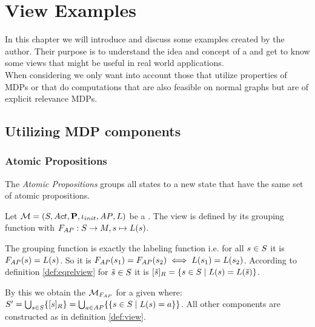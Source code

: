 \documentclass[preview]{standalone}
\begin{document}
\section{View Examples}
In this chapter we will introduce and discuss some \viewN examples created by the author. Their purpose is to understand the idea and concept of a \viewN and get to know some views that might be useful in real world applications. \\
When considering \viewsN we only want into account those that utilize properties of MDPs or that do computations that are also feasible on normal graphs but are of explicit relevance MDPs.
\subsection{Utilizing MDP components}
\subsubsection{Atomic Propositions}
The \emph{Atomic Propositions \viewNC} groups all states to a new state that have the same set of atomic propositions.

\begin{definition}	
	Let ${{{\mathcal{M}}}} = {{({S}, {Act}, {\textbf{P}}, {\iota_{init}}, {AP}, {L})}}$ be a \chosengraphtypeN. The view \viewatomicprops is defined by its grouping function \gfctatomicprops \grpfctN with $\gfctatomicprops : \states \to \imggrp, {\state}\mapsto{\labelingfct(\state)}$.
\end{definition}

The grouping function is exactly the labeling function i.e. for all ${s} \in {S}$ it is ${{{{F}}_{AP}}}({s}) = {L}({s})$. So it is ${{{{F}}_{AP}}}({s}_1) = {{{{F}}_{AP}}}({s}_2) \iff {L}({s}_1) = {L}({s}_2)$. According to definition \ref{def:eqrelview} for ${\tilde{{s}}} \in {S}$ it is ${{[{\tilde{{s}}}]_{{R}}}} = \{{s} \in {S} \mid {L}({s}) = {L}({\tilde{{s}}})\}$.

By this we obtain the \viewN ${{{{{\mathcal{M}}}}_{{{{F}}_{AP}}}}}$ for a given \chosengraphtypeN \chgph where: ${S}' = \bigcup_{{s} \in {S}} \{{{[{s}]_{{R}}}}\} =  \bigcup_{a \in {AP}} \{\{{s} \in {S} \mid {L}({s}) = a\}\}$. All other components are constructed as in definition \ref{def:view}.


\end{document}
